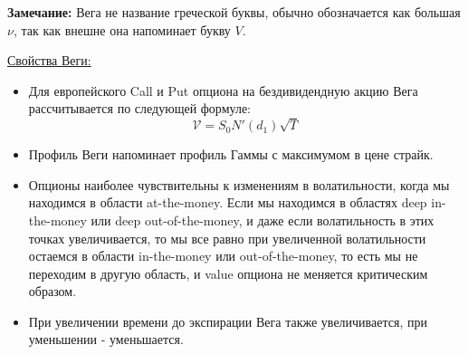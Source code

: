 \documentclass{article}
\begin{document}
 \textbf{Замечание:} Вега не название греческой буквы, обычно обозначается как большая $\nu$, так как внешне она напоминает букву $V$.
 
  \underline{Свойства Веги:}
 \begin{itemize}
 	
\item  Для европейского Call и Put опциона на бездивидендную акцию Вега рассчитывается по следующей формуле:
 $$\mathcal{V} = S_0 N'(d_1) \sqrt{T} $$
 


 	\item Профиль Веги напоминает профиль Гаммы с максимумом в цене страйк. 
 
 
 
\item Опционы наиболее чувствительны к изменениям в волатильности, когда мы находимся в области at-the-money. Если мы находимся в областях deep in-the-money или deep out-of-the-money, и даже если волатильность в этих точках увеличивается, то мы все равно при увеличенной волатильности остаемся в области in-the-money или out-of-the-money, то есть мы не переходим в другую область, и value опциона не меняется критическим образом. 

 
 \item При увеличении времени до экспирации Вега также увеличивается, при уменьшении - уменьшается.
 

\end{itemize}
\end{document}

